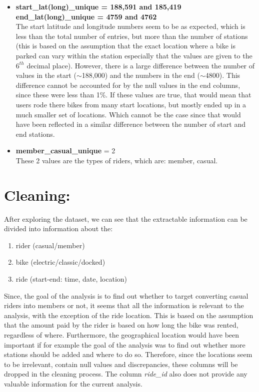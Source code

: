\documentclass[12pt]{article}
\begin{document}
\begin{itemize}
	\item \textbf{start\_lat(long)\_unique = 188,591 and 185,419} \\
	\textbf{end\_lat(long)\_unique = 4759 and 4762} \\
	The start latitude and longitude numbers seem to be as expected, which is less than the total number of entries, but more than the number of stations (this is based on the assumption that the exact location where a bike is parked can vary within the station especially that the values are given to the $6^{th}$ decimal place). However, there is a large difference between the number of values in the start ($\sim$188,000) and the numbers in the end ($\sim$4800). This difference cannot be accounted for by the null values in the end columns, since these were less than 1\%. If these values are true, that would mean that users rode there bikes from many start locations, but mostly ended up in a much smaller set of locations. Which cannot be the case since that would have been reflected in a similar difference between the number of start and end stations. 
	\item \textbf{member\_casual\_unique} = 2 \\
	These 2 values are the types of riders, which are: member, casual.
	\end{itemize}

	
\section*{Cleaning:}
After exploring the dataset, we can see that the extractable information can be divided into information about the:
	\begin{enumerate} 
	\item rider (casual/member)
	\item bike (electric/classic/docked)
	\item ride (start-end: time, date, location)
	\end{enumerate}
	
Since, the goal of the analysis is to find out whether to target converting casual riders into members or not, it seems that all the information is relevant to the analysis, with the exception of the ride location. This is based on the assumption that the amount paid by the rider is based on how long the bike was rented, regardless of where. Furthermore, the geographical location would have been important if for example the goal of the analysis was to find out whether more stations should be added and where to do so. Therefore, since the locations seem to be irrelevant, contain null values and discrepancies, these columns will be dropped in the cleaning process. The column \textit{ride\_id} also does not provide any valuable information for the current analysis. \\
\end{document}
